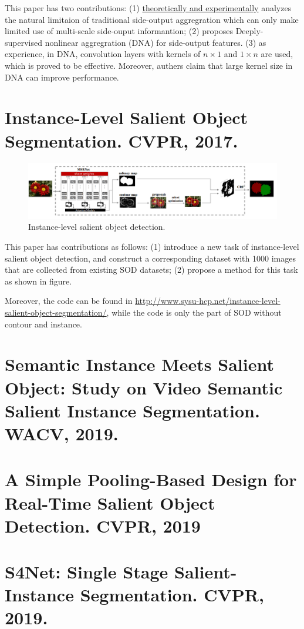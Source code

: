 \documentclass[10pt,onecolumn]{book}
\begin{document}
This paper has two contributions: 
(1) \uline{theoretically and experimentally} analyzes the natural limitaion of traditional side-output aggregration which can only make limited use of multi-scale side-ouput informantion; 
(2) proposes Deeply-supervised nonlinear aggregration (DNA) for side-output features. 
(3) as experience, in DNA, convolution layers with kernels of $n \times 1$ and $1 \times n$ are used, which is proved to be effective. Moreover, authers claim that large kernel size in DNA can improve performance.

\section{Instance-Level Salient Object Segmentation. CVPR, 2017.}
\begin{figure}[h]
\centering
\includegraphics[width=1\textwidth]{figures_paper_reading/instance-SOD.png}
\caption{Instance-level salient object detection.}
\end{figure}

This paper has contributions as follows:
(1) introduce a new task of instance-level salient object detection, and construct a corresponding dataset with 1000 images that are collected from existing SOD datasets;
(2) propose a method for this task as shown in figure.

Moreover, the code can be found in \url{http://www.sysu-hcp.net/instance-level-salient-object-segmentation/}, while the code is only the part of SOD without contour and instance.

\section{Semantic Instance Meets Salient Object: Study on Video Semantic Salient Instance Segmentation. WACV, 2019.}

\section{A Simple Pooling-Based Design for Real-Time Salient Object Detection. CVPR, 2019}

\section{S4Net: Single Stage Salient-Instance Segmentation. CVPR, 2019.}
\end{document}
